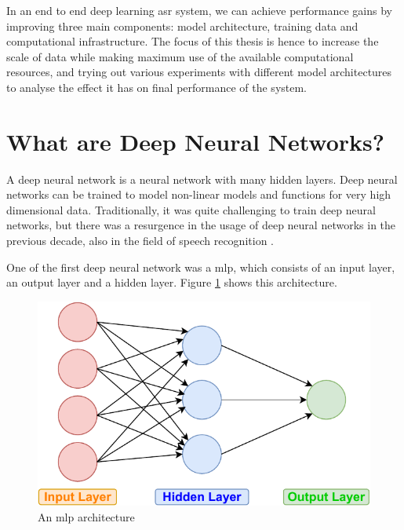 In an end to end deep learning \acrshort{asr} system, we can achieve performance gains by improving three main components: model architecture, training data and computational infrastructure. The focus of this thesis is hence to increase the scale of data while making maximum use of the available computational resources, and trying out various experiments with different model architectures to analyse the effect it has on final performance of the system.

\section{What are Deep Neural Networks?}
A deep neural network is a neural network with many hidden layers. Deep neural networks can be trained to model non-linear models and functions for very high dimensional data\cite{Hammer2003AMachines}. Traditionally, it was quite challenging to train deep neural networks, but there was a resurgence in the usage of deep neural networks in the previous decade, also in the field of speech recognition \cite{Dahl2012Context-DependentRecognition, Morgan2012DeepRecognition, Deng2013RECENTMICROSOFT, Hannun2014DeepRecognition}. 

One of the first deep neural network was a \acrfull{mlp}, which consists of an input layer, an output layer and a hidden layer. Figure \ref{fig:mlp} shows this architecture. 

\begin{figure}[ht]
  \begin{center}
    \includegraphics[width=\textwidth]{images/MLP.pdf} 
    \caption{An \acrshort{mlp} architecture}
    \label{fig:mlp}
  \end{center}
\end{figure}

